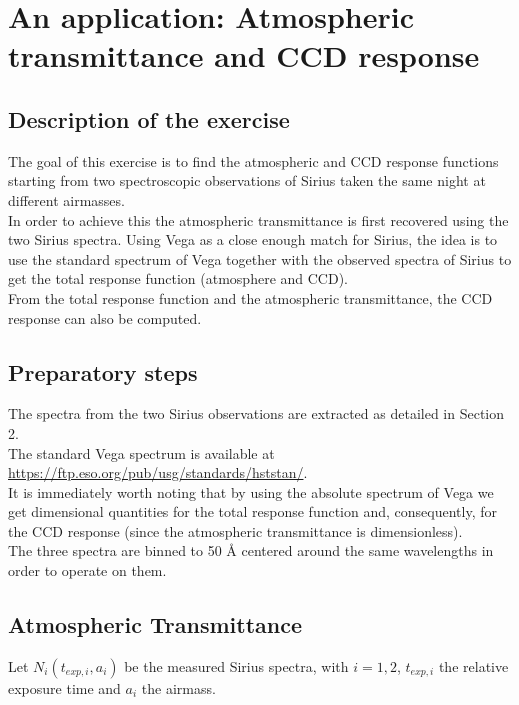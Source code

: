 \documentclass[a4paper]{article}
\begin{document}
	\section{An application: Atmospheric transmittance and CCD response}
	\begin{multicols}{2}
		\subsection{Description of the exercise}
			The goal of this exercise is to find the atmospheric and CCD response functions starting from two spectroscopic observations of Sirius taken the same night at different airmasses.\\
			In order to achieve this the atmospheric transmittance is first recovered using the two Sirius spectra. Using Vega as a close enough match for Sirius, the idea is to use the standard spectrum of Vega together with the observed spectra of Sirius to get the total response function (atmosphere and CCD).\\
			From the total response function and the atmospheric transmittance, the CCD response can also be computed.\\
			
		\subsection{Preparatory steps}
			The spectra from the two Sirius observations are extracted as detailed in Section 2.\\
			
			The standard Vega spectrum is available at \url{https://ftp.eso.org/pub/usg/standards/hststan/}.\\
			It is immediately worth noting that by using the absolute spectrum of Vega we get dimensional quantities for the total response function and, consequently, for the CCD response (since the atmospheric transmittance is dimensionless).\\
			
			The three spectra are binned to 50 \si{\angstrom} centered around the same wavelengths in order to operate on them.
		
		\subsection{Atmospheric Transmittance}
			Let $N_i(t_{exp,i}, a_i)$ be the measured Sirius spectra, with $i = 1,2$, $t_{exp,i}$ the relative exposure time and $a_i$ the airmass.\\
			

\end{multicols}
\end{document}
